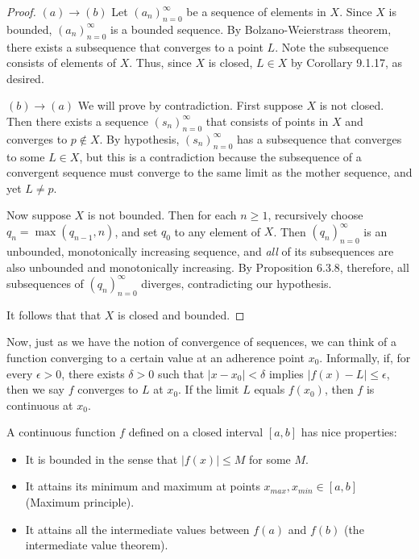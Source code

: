 \documentclass{article}
\newcommand{\ra}{\rightarrow}
\begin{document}
\begin{proof}
$(a) \ra (b)$ Let $(a_n)_{n=0}^\infty$ be a sequence of elements in $X$. Since $X$ is bounded, $(a_n)_{n=0}^\infty$ is a bounded sequence. By Bolzano-Weierstrass theorem, there exists a subsequence that converges to a point $L$. Note the subsequence consists of elements of $X$. Thus, since $X$ is closed, $L \in X$ by Corollary 9.1.17, as desired.

$(b) \ra (a)$ We will prove by contradiction. First suppose $X$ is not closed. Then there exists a sequence $(s_n)_{n=0}^\infty$ that consists of points in $X$ and converges to $p \notin X$. By hypothesis, $(s_n)_{n=0}^\infty$ has a subsequence that converges to some $L \in X$, but this is a contradiction because the subsequence of a convergent sequence must converge to the same limit as the mother sequence, and yet $L \neq p$.

Now suppose $X$ is not bounded. Then for each $n \geq 1$, recursively choose $q_n = \max(q_{n-1}, n)$, and set $q_0$ to any element of $X$. Then $(q_n)_{n=0}^\infty$ is an unbounded, monotonically increasing sequence, and \textit{all} of its subsequences are also unbounded and monotonically increasing. By Proposition 6.3.8, therefore, all subsequences of $(q_n)_{n=0}^\infty$ diverges, contradicting our hypothesis.

It follows that that $X$ is closed and bounded.
\end{proof}

Now, just as we have the notion of convergence of sequences, we can think of a function converging to a certain value at an adherence point $x_0$. Informally, if, for every $\epsilon > 0$, there exists $\delta > 0$ such that $|x - x_0| < \delta$ implies $|f(x) - L | \leq \epsilon$, then we say $f$ converges to $L$ at $x_0$. If the limit $L$ equals $f(x_0)$, then $f$ is continuous at $x_0$.

A continuous function $f$ defined on a closed interval $[a,b]$ has nice properties:

\begin{itemize}
    \item It is bounded in the sense that $|f(x)| \leq M$ for some $M$. 
    \item It attains its minimum and maximum at points $x_{max}, x_{min} \in [a,b]$ (Maximum principle).
    \item It attains all the intermediate values between $f(a)$ and $f(b)$ (the intermediate value theorem).
\end{itemize}
\end{document}

